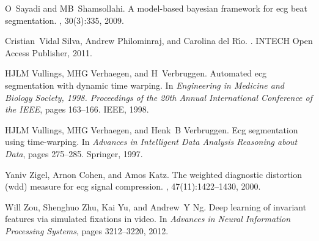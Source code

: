 \begin{thebibliography}{99.}
O~Sayadi and MB~Shamsollahi.
\newblock A model-based bayesian framework for ecg beat segmentation.
, 30(3):335, 2009.

Cristian~Vidal Silva, Andrew Philominraj, and Carolina del R{\'\i}o.
.
\newblock INTECH Open Access Publisher, 2011.

HJLM Vullings, MHG Verhaegen, and H~Verbruggen.
\newblock Automated ecg segmentation with dynamic time warping.
\newblock In {\em Engineering in Medicine and Biology Society, 1998.
  Proceedings of the 20th Annual International Conference of the IEEE}, pages
  163--166. IEEE, 1998.

HJLM Vullings, MHG Verhaegen, and Henk~B Verbruggen.
\newblock Ecg segmentation using time-warping.
\newblock In {\em Advances in Intelligent Data Analysis Reasoning about Data},
  pages 275--285. Springer, 1997.

Yaniv Zigel, Arnon Cohen, and Amos Katz.
\newblock The weighted diagnostic distortion (wdd) measure for ecg signal
  compression.
,
  47(11):1422--1430, 2000.

Will Zou, Shenghuo Zhu, Kai Yu, and Andrew~Y Ng.
\newblock Deep learning of invariant features via simulated fixations in video.
\newblock In {\em Advances in Neural Information Processing Systems}, pages
  3212--3220, 2012.



\end{thebibliography}
